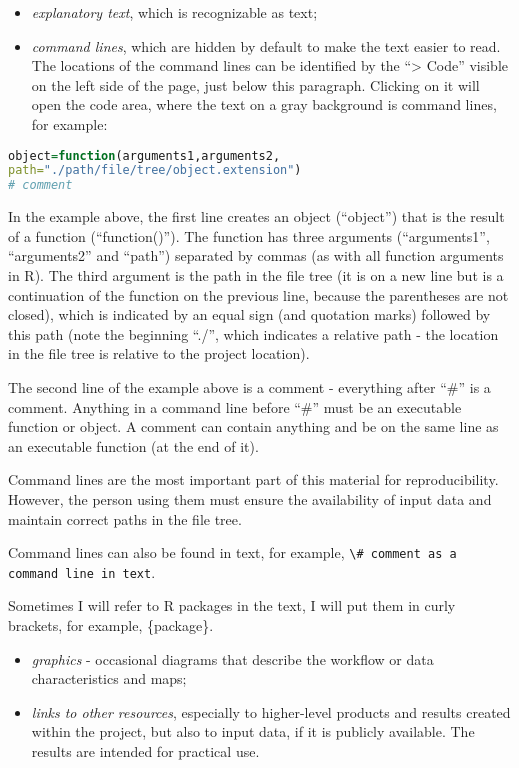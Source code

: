 \documentclass[
]{book}
\newcommand{\passthrough}[1]{#1}
\begin{document}
\begin{itemize}
\item
  \emph{explanatory text}, which is recognizable as text;
\item
  \emph{command lines}, which are hidden by default to make the text easier to read.
  The locations of the command lines can be identified by the ``\textbar\textgreater{} Code'' visible
  on the left side of the page, just below this paragraph. Clicking on it will open
  the code area, where the text on a gray background is command lines, for example:
\end{itemize}

\begin{lstlisting}[language=R]
object=function(arguments1,arguments2,
path="./path/file/tree/object.extension")
# comment
\end{lstlisting}

In the example above, the first line creates an object (``object'') that is
the result of a function (``function()''). The function has three
arguments (``arguments1'', ``arguments2'' and ``path'') separated by commas (as with all
function arguments in R). The third argument is the path in the file tree (it is
on a new line but is a continuation of the function on the previous line, because
the parentheses are not closed), which is indicated by an equal sign (and quotation
marks) followed by this path (note the beginning ``./'', which indicates a relative
path - the location in the file tree is relative to the project location).

The second line of the example above is a comment - everything after ``\#'' is a
comment. Anything in a command line before ``\#'' must be an executable function or
object. A comment can contain anything and be on the same line as an executable
function (at the end of it).

Command lines are the most important part of this material for reproducibility.
However, the person using them must ensure the availability of input data and
maintain correct paths in the file tree.

Command lines can also be found in text, for example, \passthrough{\lstinline!\# comment as a command line in text!}.

Sometimes I will refer to R packages in the text, I will put them in curly
brackets, for example, \{package\}.

\begin{itemize}
\item
  \emph{graphics} - occasional diagrams that describe the workflow or data
  characteristics and maps;
\item
  \emph{links to other resources}, especially to higher-level products and results
  created within the project, but also to input data, if it is publicly
  available. The results are intended for practical use.
\end{itemize}
\end{document}
